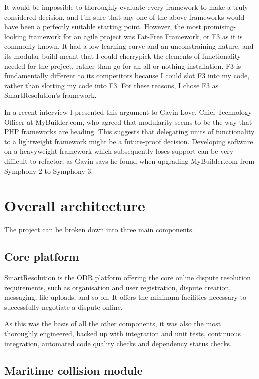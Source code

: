 It would be impossible to thoroughly evaluate every framework to make a truly considered decision, and I'm sure that any one of the above frameworks would have been a perfectly suitable starting point. However, the most promising-looking framework for an agile project was Fat-Free Framework, or F3 as it is commonly known. It had a low learning curve and an unconstraining nature, and its modular build meant that I could cherrypick the elements of functionality needed for the project, rather than go for an all-or-nothing installation. F3 is fundamentally different to its competitors because I could slot F3 into my code, rather than slotting my code into F3. For these reasons, I chose F3 as SmartResolution's framework.

In a recent interview I presented this argument to Gavin Love, Chief Technology Officer at MyBuilder.com, who agreed that modularity seems to be the way that PHP frameworks are heading. This suggests that delegating units of functionality to a lightweight framework might be a future-proof decision. Developing software on a heavyweight framework which subsequently loses support can be very difficult to refactor, as Gavin says he found when upgrading MyBuilder.com from Symphony 2 to Symphony 3.

\section{Overall architecture}

The project can be broken down into three main components.

\subsection{Core platform}

SmartResolution is the ODR platform offering the core online dispute resolution requirements, such as organisation and user registration, dispute creation, messaging, file uploads, and so on. It offers the minimum facilities necessary to successfully negotiate a dispute online.

As this was the basis of all the other components, it was also the most thoroughly engineered, backed up with integration and unit tests, continuous integration, automated code quality checks and dependency status checks.

\subsection{Maritime collision module}

